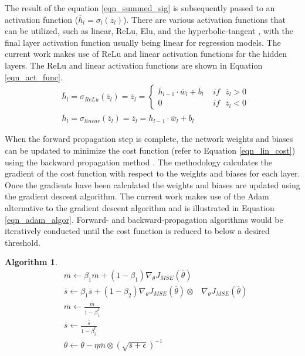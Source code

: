 \documentclass[a4paper,fleqn]{cas-sc}
\newtheorem{theorem}{Algorithm}
\begin{document}
The result of the equation \ref{eqn_summed_sig} is subsequently passed to an activation function ($\overline{h}_l = \sigma_l(\overline{z}_l)$). There are various activation functions that can be utilized, such as linear, ReLu, Elu, and the hyperbolic-tangent \citep{goodfellow}, with the final layer activation function usually being linear for regression models. The current work makes use of ReLu and linear activation functions for the hidden layers. The ReLu and linear activation functions are shown in Equation \ref{eqn_act_func}.
\begin{equation}\label{eqn_act_func}
\begin{split}
&\overline{h}_l=\sigma_{ReLu}(\overline{z}_l) = \overline{z}_l =  
	\begin{cases}
	 \overline{h}_{l-1}\cdot\overline{w}_l+\overline{b}_l\,\, &if\,\,\,\, \overline{z}_l>0\\
	 0\,\, &if\,\,\,\, \overline{z}_l<0
	\end{cases}\\
&\overline{h}_l=\sigma_{linear}(\overline{z}_l) = \overline{z}_l = \overline{h}_{l-1}\cdot\overline{w}_l+\overline{b}_l
\end{split}
\end{equation}

When the forward propagation step is complete, the network weights and biases can be updated to minimize the cost function (refer to Equation \ref{eqn_lin_cost}) using the backward propagation method \cite{Rumelhart1986}. The methodology calculates the gradient of the cost function with respect to the weights and biases for each layer. Once the gradients have been calculated the weights and biases are updated using the gradient descent algorithm. The current work makes use of the Adam \cite{goodfellow} alternative to the gradient descent algorithm and is illustrated in Equation \ref{eqn_adam_algor}. Forward- and backward-propagation algorithms would be iteratively conducted until the cost function is reduced to below a desired threshold.

\begin{theorem} 
\begin{equation}\label{eqn_adam_algor} 
\begin{split}
&\overline{m}\leftarrow \beta_1\overline{m}+(1-\beta_1)\nabla_{\theta}J_{MSE}(\overline{\theta})\\
&\overline{s}\leftarrow \beta_1\overline{s}+(1-\beta_2)\nabla_{\theta}J_{MSE}(\overline{\theta})\otimes&\nabla_{\theta}J_{MSE}(\overline{\theta})\\
&\overline{m}\leftarrow\frac{\overline{m}}{1-\beta_1^t} \\
&\overline{s}\leftarrow\frac{\overline{s}}{1-\beta_2^t}\\
&\overline{\theta}\leftarrow\overline{\theta}-\eta\overline{m}\otimes(\sqrt{\overline{s}+\epsilon})^{-1}\\
\end{split}
\end{equation}
\end{theorem}
\end{document}
